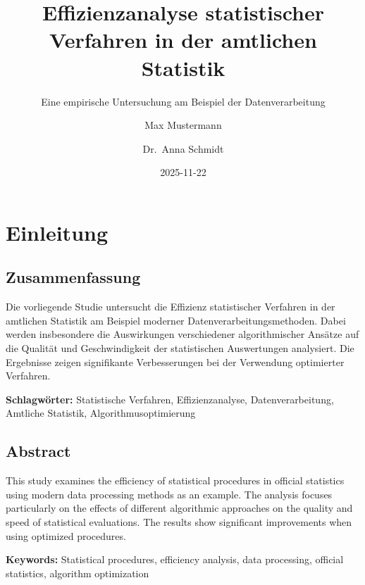 \documentclass[
  ngerman,
  10pt,
  letterpaper,
  twocolumn]{book}
\title{Effizienzanalyse statistischer Verfahren in der amtlichen
Statistik}
\subtitle{Eine empirische Untersuchung am Beispiel der
Datenverarbeitung}
\author{Max Mustermann \and Dr.~Anna Schmidt}
\date{2025-11-22}
\renewcommand*\contentsname{Inhaltsverzeichnis}
\newcommand\contentsname{Inhaltsverzeichnis}
\begin{document}
\frontmatter
\maketitle

\renewcommand*\contentsname{Inhaltsverzeichnis}
{
\setcounter{tocdepth}{2}
\tableofcontents
}

\mainmatter
{}

\chapter*{Einleitung}\label{einleitung}


\section*{Zusammenfassung}\label{zusammenfassung}


Die vorliegende Studie untersucht die Effizienz statistischer Verfahren
in der amtlichen Statistik am Beispiel moderner
Datenverarbeitungsmethoden. Dabei werden insbesondere die Auswirkungen
verschiedener algorithmischer Ansätze auf die Qualität und
Geschwindigkeit der statistischen Auswertungen analysiert. Die
Ergebnisse zeigen signifikante Verbesserungen bei der Verwendung
optimierter Verfahren.

\textbf{Schlagwörter:} Statistische Verfahren, Effizienzanalyse,
Datenverarbeitung, Amtliche Statistik, Algorithmusoptimierung

\section*{Abstract}\label{abstract}


This study examines the efficiency of statistical procedures in official
statistics using modern data processing methods as an example. The
analysis focuses particularly on the effects of different algorithmic
approaches on the quality and speed of statistical evaluations. The
results show significant improvements when using optimized procedures.

\textbf{Keywords:} Statistical procedures, efficiency analysis, data
processing, official statistics, algorithm optimization
\end{document}

